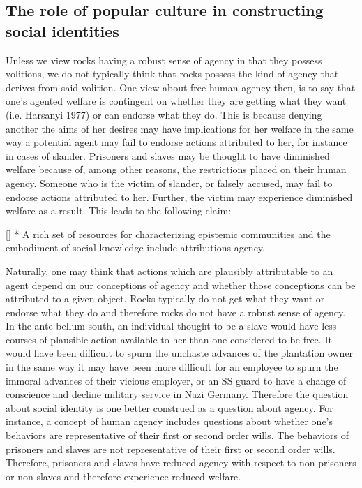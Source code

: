 \documentclass[12pt]{book}
\theoremstyle{definition}
\theoremstyle{remark}
\newcommand{\NormalTok}[1]{#1}
\newenvironment{Shaded}{}{}
\newenvironment{Highlighting}{}{}
\begin{document}
\subsection*{The role of popular culture in constructing social identities}\label{the-role-of-popular-culture-in-constructing-social-identities}

Unless we view rocks having a robust sense of agency in that they possess volitions, we do not typically think that rocks possess the kind of agency that derives from said volition. One view about free human agency then, is to say that one's agented welfare is contingent on whether they are getting what they want (i.e. Harsanyi 1977) or can endorse what they do. This is because denying another the aims of her desires may have implications for her welfare in the same way a potential agent may fail to endorse actions attributed to her, for instance in cases of slander. Prisoners and slaves may be thought to have diminished welfare because of, among other reasons, the restrictions placed on their human agency. Someone who is the victim of slander, or falsely accused, may fail to endorse actions attributed to her. Further, the victim may experience diminished welfare as a result. This leads to the following claim:

\begin{Shaded}
\begin{Highlighting}[]
\NormalTok{* A rich set of resources for characterizing epistemic communities and the embodiment of social knowledge include attributions agency.}
\end{Highlighting}
\end{Shaded}

Naturally, one may think that actions which are plausibly attributable to an agent depend on our conceptions of agency and whether those conceptions can be attributed to a given object. Rocks typically do not get what they want or endorse what they do and therefore rocks do not have a robust sense of agency. In the ante-bellum south, an individual thought to be a slave would have less courses of plausible action available to her than one considered to be free. It would have been difficult to spurn the unchaste advances of the plantation owner in the same way it may have been more difficult for an employee to spurn the immoral advances of their vicious employer, or an SS guard to have a change of conscience and decline military service in Nazi Germany. Therefore the question about social identity is one better construed as a question about agency. For instance, a concept of human agency includes questions about whether one's behaviors are representative of their first or second order wills. The behaviors of prisoners and slaves are not representative of their first or second order wills. Therefore, prisoners and slaves have reduced agency with respect to non-prisoners or non-slaves and therefore experience reduced welfare.
\end{document}
